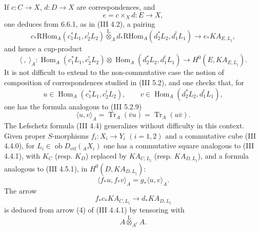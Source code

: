 \documentclass[11pt]{article}
\DeclareMathOperator{\Hom}{Hom}
\providecommand{\RHom}{\mathrm{RHom}}
\providecommand{\Tr}{\operatorname{Tr}}
\providecommand{\Tr}{\operatorname{Tr}}
\providecommand{\lten}{\overset{\mathrm L}{\otimes}}
\providecommand{\Ob}{\operatorname{ob}}
\providecommand{\Tr}{\operatorname{Tr}}
\providecommand{\RHom}{\mathrm{RHom}}
\providecommand{\Hom}{\operatorname{Hom}}
\providecommand{\lten}{\overset{\mathrm L}{\otimes}}
\providecommand{\RHom}{\mathrm R\mathcal{H}om}
\providecommand{\lten}{\overset{\mathrm L}{\otimes}}
\providecommand{\Ob}{\operatorname{ob}}
\providecommand{\Tr}{\operatorname{Tr}}
\providecommand{\lten}{\overset{\mathrm L}{\otimes}}
\providecommand{\lten}{\overset{\mathrm L}{\otimes}}
\providecommand{\Ob}{\operatorname{Ob}}
\providecommand{\lten}{\overset{\mathrm L}{\otimes}}
\providecommand{\RHom}{\mathrm{RHom}}
\begin{document}
If $c:C\to X$, $d:D\to X$ are correspondences, and
\[
e=c\times_Xd:E\to X,
\]
one deduces from 6.6.1, as in (III 4.2), a pairing
\begin{equation}
c_*\RHom_A(c_1^*L_1,c_2^!L_2)
\lten_{\Lambda}
d_*\RHom_A(d_2^*L_2,d_1^!L_1)
\longrightarrow
e_*KA_{E,L_{\natural}},
\tag{6.6.2}
\end{equation}
and hence a cup-product
\begin{equation}
\langle\ ,\ \rangle_A:
\Hom_A(c_1^*L_1,c_2^!L_2)\otimes
\Hom_A(d_2^*L_2,d_1^!L_1)
\longrightarrow
H^0(E,KA_{E,L_{\natural}}).
\tag{6.6.3}
\end{equation}
It is not difficult to extend to the non-commutative case the notion of composition of correspondences studied in (III 5.2), and one checks that, for
\[
u\in\Hom_A(c_1^*L_1,c_2^!L_2),\qquad
v\in\Hom_A(d_2^*L_2,d_1^!L_1),
\]
one has the formula analogous to (III 5.2.9)
\begin{equation}
\langle u,v\rangle_A=\Tr_A(\bar vu)=\Tr_A(u\bar v).
\tag{6.6.4}
\end{equation}
The Lefschetz formula (III 4.4) generalizes without difficulty in this context. Given proper $S$-morphisms $f_i:X_i\to Y_i$ $(i=1,2)$ and a commutative cube (III 4.4.0), for $L_i\in\Ob D_{\mathrm{ctf}}({}_AX_i)$ one has a commutative square analogous to (III 4.4.1), with $K_C$ (resp. $K_D$) replaced by $KA_{C,L_{\natural}}$ (resp. $KA_{D,L_{\natural}}$), and a formula analogous to (III 4.5.1), in $H^0(D,KA_{D,L_{\natural}})$:
\begin{equation}
\langle f_*u,f_*v\rangle_A=g_*\langle u,v\rangle_A.
\tag{6.6.5}
\end{equation}
The arrow
\[
f_*c_*KA_{C,L_{\natural}}\longrightarrow d_*KA_{D,L_{\natural}}
\]
is deduced from arrow (4) of (III 4.4.1) by tensoring with
\[
A\lten_{A^e}A .
\]
\end{document}
